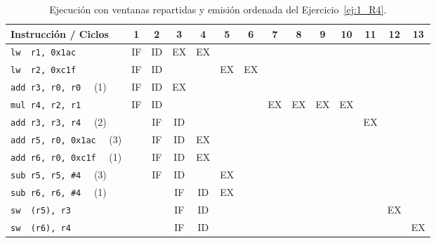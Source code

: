 \begin{ejercicio}
\begin{table}
\centering
\scriptsize
\begin{tabular}{|l|c|c|c|c|c|c|c|c|c|c|c|c|c|}
    \hline
    Instrucción / Ciclos & 1 & 2 & 3 & 4 & 5 & 6 & 7 & 8 & 9 & 10 & 11 & 12 & 13 \\
    \hline
    \verb|lw  r1, 0x1ac|     & IF & ID & EX & EX & & & & & & & & & \\
    \hline        
    \verb|lw  r2, 0xc1f|     & IF & ID & & & EX & EX & & & & & & & \\
    \hline           
    \verb|add r3, r0, r0| ~~(1)    & IF & ID & EX & & & & & & & & & & \\
    \hline                        
    \verb|mul r4, r2, r1|    & IF & ID & & & & & EX & EX & EX & EX & & & \\
    \hline            
    \verb|add r3, r3, r4| ~~(2)    & & IF & ID & & & & & & & & EX & & \\
    \hline
    \verb|add r5, r0, 0x1ac| ~~(3) & & IF & ID & EX & & & & & & & & & \\
    \hline
    \verb|add r6, r0, 0xc1f| ~~(1) & & IF & ID & EX & & & & & & & & & \\
    \hline
    \verb|sub r5, r5, #4| ~~(3)    & & IF & ID & & EX & & & & & & & & \\
    \hline            
    \verb|sub r6, r6, #4| ~~(1)    & & & IF & ID & EX & & & & & & & & \\
    \hline
    \verb|sw  (r5), r3|      & & & IF & ID & & & & & & & & EX & \\
    \hline
    \verb|sw  (r6), r4|      & & & IF & ID & & & & & & & & & EX \\
    \hline
\end{tabular}
\caption{Ejecución con ventanas repartidas y emisión ordenada del Ejercicio~\ref{ej:1_R4}.}
\label{tab:ej1_R4_3}
\end{table}

\end{ejercicio}

